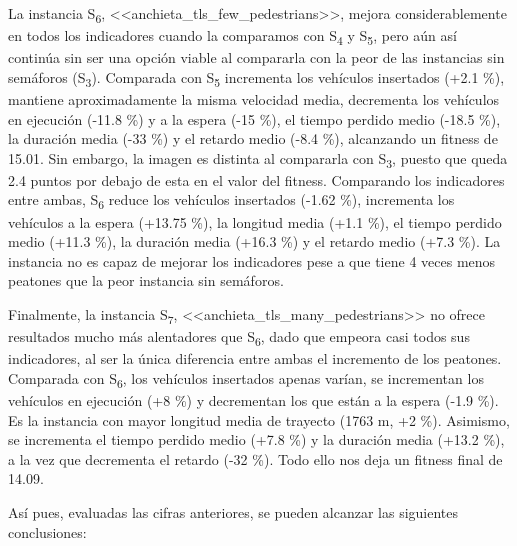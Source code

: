 La instancia S\textsubscript{6}, <<anchieta\_tls\_few\_pedestrians>>, mejora considerablemente en todos los indicadores cuando la comparamos con S\textsubscript{4} y S\textsubscript{5}, pero aún así continúa sin ser una opción viable al compararla con la peor de las instancias sin semáforos (S\textsubscript{3}). Comparada con S\textsubscript{5} incrementa los vehículos insertados (+2.1 \%), mantiene aproximadamente la misma velocidad media, decrementa los vehículos en ejecución (-11.8 \%) y a la espera (-15 \%), el tiempo perdido medio (-18.5 \%), la duración media (-33 \%) y el retardo medio (-8.4 \%), alcanzando un fitness de 15.01. Sin embargo, la imagen es distinta al compararla con S\textsubscript{3}, puesto que queda 2.4 puntos por debajo de esta en el valor del fitness. Comparando los indicadores entre ambas, S\textsubscript{6} reduce los vehículos insertados (-1.62 \%), incrementa los vehículos a la espera (+13.75 \%), la longitud media (+1.1 \%), el tiempo perdido medio (+11.3 \%), la duración media (+16.3 \%) y el retardo medio (+7.3 \%). La instancia no es capaz de mejorar los indicadores pese a que tiene 4 veces menos peatones que la peor instancia sin semáforos.

Finalmente, la instancia S\textsubscript{7}, <<anchieta\_tls\_many\_pedestrians>> no ofrece resultados mucho más alentadores que S\textsubscript{6}, dado que empeora casi todos sus indicadores, al ser la única diferencia entre ambas el incremento de los peatones. Comparada con S\textsubscript{6}, los vehículos insertados apenas varían, se incrementan los vehículos en ejecución (+8 \%) y decrementan los que están a la espera (-1.9 \%). Es la instancia con mayor longitud media de trayecto (1763 m, +2 \%). Asimismo, se incrementa el tiempo perdido medio (+7.8 \%) y la duración media (+13.2 \%), a la vez que decrementa el retardo (-32 \%). Todo ello nos deja un fitness final de 14.09.

Así pues, evaluadas las cifras anteriores, se pueden alcanzar las siguientes conclusiones:

